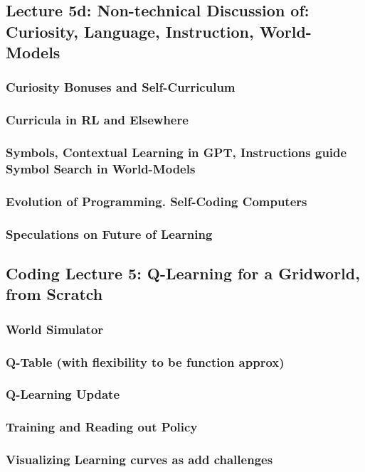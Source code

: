 \documentclass[12pt]{article}
\begin{document}
    \subsection*{Lecture 5d: Non-technical Discussion of: Curiosity, Language, Instruction, World-Models}
      \subsubsection*{Curiosity Bonuses and Self-Curriculum} %
      \subsubsection*{Curricula in RL and Elsewhere}
      \subsubsection*{Symbols, Contextual Learning in GPT, Instructions guide Symbol Search in World-Models}
      \subsubsection*{Evolution of Programming.  Self-Coding Computers}
      \subsubsection*{Speculations on Future of Learning}
    \newpage

    \subsection*{Coding Lecture 5: Q-Learning for a Gridworld, from Scratch}
      \subsubsection*{World Simulator}
      \subsubsection*{Q-Table (with flexibility to be function approx)}
      \subsubsection*{Q-Learning Update}
      \subsubsection*{Training and Reading out Policy}
      \subsubsection*{Visualizing Learning curves as add challenges}
    \newpage
\end{document}
